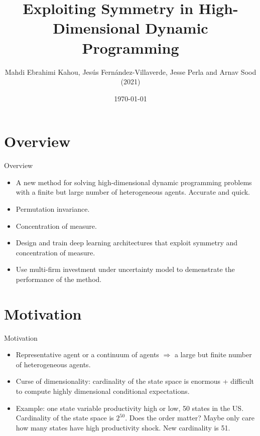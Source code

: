 \documentclass[dvipsnames,mathserif]{beamer}
\begin{document}
\rightskip\rightmargin
\title{Exploiting Symmetry in High-Dimensional Dynamic Programming}
\author{Mahdi Ebrahimi Kahou, Jesús Fernández-Villaverde, Jesse Perla and Arnav Sood (2021)}

\footnotesize{\date{\today }


\begin{frame}
\maketitle
\end{frame}


%
\footnotesize \tableofcontents
%
\section{Overview}
\begin{frame}{Overview}
    \begin{itemize}
        \item A new method for solving high-dimensional dynamic programming problems with a finite but large number of heterogeneous agents. Accurate and quick.\\
        \vspace{0.2cm}
        \item Permutation invariance.
        \vspace{0.2cm}
        \item Concentration of measure.
        \vspace{0.2cm}
        \item Design and train deep learning architectures that exploit symmetry and concentration of measure.
        \item Use multi-firm investment under uncertainty model to demenstrate the performance of the method. 
    \end{itemize}
\end{frame}

\section{Motivation}
\begin{frame}{Motivation}
    \begin{itemize}
        \item Representative agent or a continuum of agents $\Rightarrow$ a large but finite number of heterogeneous agents.\\
        \item Curse of dimensionality: cardinality of the state space is enormous + difficult to compute highly dimensional conditional expectations.\\
        \item Example: one state variable productivity high or low, 50 states in the US. Cardinality of the state space is $2^{50}$. Does the order matter? Maybe only care how many states have high productivity shock. New cardinality is 51.\\
    \end{itemize}
\end{frame}

}
\end{document}
